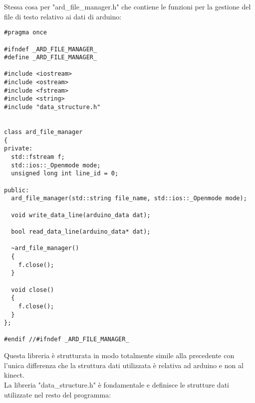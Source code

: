 \documentclass[10pt,a4paper]{article}
\begin{document}
%
%
Stessa cosa per "ard\_file\_manager.h" che contiene le funzioni per la gestione del file di testo relativo ai dati di arduino:
\begin{lstlisting}[style=mycpp, caption=librerie usate, captionpos=b]
#pragma once

#ifndef _ARD_FILE_MANAGER_
#define _ARD_FILE_MANAGER_

#include <iostream>
#include <ostream>
#include <fstream>
#include <string>
#include "data_structure.h"


class ard_file_manager
{
private:
  std::fstream f;
  std::ios::_Openmode mode;
  unsigned long int line_id = 0;

public:
  ard_file_manager(std::string file_name, std::ios::_Openmode mode);

  void write_data_line(arduino_data dat);

  bool read_data_line(arduino_data* dat);

  ~ard_file_manager()
  {
    f.close();
  }

  void close()
  {
    f.close();
  }
};

#endif //#ifndef _ARD_FILE_MANAGER_
\end{lstlisting}
Questa libreria \`e strutturata in modo totalmente simile alla precedente con l'unica differenza che la struttura dati utilizzata \`e relativa ad arduino e non al kinect.
\\
%
%
La libreria "data\_structure.h" \`e fondamentale e definisce le strutture dati utilizzate nel resto del programma:
\end{document}

